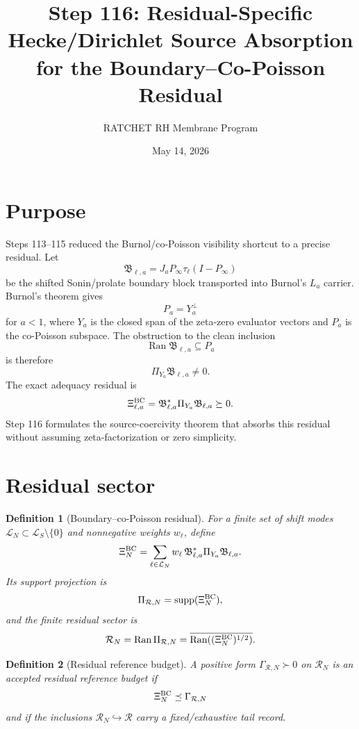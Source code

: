\documentclass[11pt]{article}
\title{Step 116: Residual-Specific Hecke/Dirichlet Source Absorption for the Boundary--Co-Poisson Residual}
\author{RATCHET RH Membrane Program}
\date{May 14, 2026}
\newtheorem{definition}{Definition}
\begin{document}
\maketitle

\section{Purpose}
Steps 113--115 reduced the Burnol/co-Poisson visibility shortcut to a precise residual.  Let
\[
  \mathfrak B_{\ell,a}=J_aP_\infty\tau_\ell(I-P_\infty)
\]
be the shifted Sonin/prolate boundary block transported into Burnol's $L_a$ carrier.  Burnol's theorem gives
\[
  P_a=Y_a^\perp
\]
for $a<1$, where $Y_a$ is the closed span of the zeta-zero evaluator vectors and $P_a$ is the co-Poisson subspace.  The obstruction to the clean inclusion
\[
  \operatorname{Ran}\mathfrak B_{\ell,a}\subseteq P_a
\]
is therefore
\[
  \Pi_{Y_a}\mathfrak B_{\ell,a}\neq0.
\]
The exact adequacy residual is
\[
  \Xi^{\rm BC}_{\ell,a}=\mathfrak B_{\ell,a}^*\Pi_{Y_a}\mathfrak B_{\ell,a}\succeq0.
\]
Step 116 formulates the source-coercivity theorem that absorbs this residual without assuming zeta-factorization or zero simplicity.

\section{Residual sector}
\begin{definition}[Boundary--co-Poisson residual]
For a finite set of shift modes $\mathcal L_N\subset\mathcal L_S\setminus\{0\}$ and nonnegative weights $w_\ell$, define
\[
  \Xi^{\rm BC}_N=\sum_{\ell\in\mathcal L_N}w_\ell\,\mathfrak B_{\ell,a}^*\Pi_{Y_a}\mathfrak B_{\ell,a}.
\]
Its support projection is
\[
  \Pi_{\mathcal R,N}=\operatorname{supp}(\Xi^{\rm BC}_N),
\]
and the finite residual sector is
\[
  \mathcal R_N=\operatorname{Ran}\Pi_{\mathcal R,N}=\overline{\operatorname{Ran}((\Xi^{\rm BC}_N)^{1/2})}.
\]
\end{definition}

\begin{definition}[Residual reference budget]
A positive form $\Gamma_{\mathcal R,N}\succ0$ on $\mathcal R_N$ is an accepted residual reference budget if
\[
  \Xi^{\rm BC}_N\preceq \Gamma_{\mathcal R,N}
\]
and if the inclusions $\mathcal R_N\hookrightarrow\mathcal R$ carry a fixed/exhaustive tail record.
\end{definition}
\end{document}
